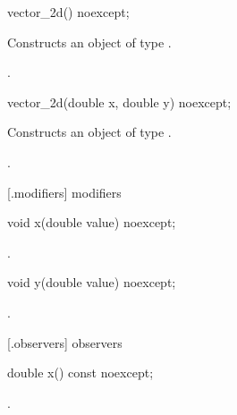 \begin{itemdecl}
vector_2d() noexcept;
\end{itemdecl}
\begin{itemdescr}
	\pnum
	\effects
	Constructs an object of type .
	
	\pnum
	\postconditions
	.
\end{itemdescr}

\begin{itemdecl}
vector_2d(double x, double y) noexcept;
\end{itemdecl}
\begin{itemdescr}
	\pnum
	\effects
	Constructs an object of type .
	
	\pnum
	\postconditions
	.
\end{itemdescr}
	
 [\vectortwod.modifiers]{ modifiers}

\begin{itemdecl}
void x(double value) noexcept;
\end{itemdecl}
\begin{itemdescr}
	\pnum
	\postconditions
	.
	
\end{itemdescr}

\begin{itemdecl}
    void y(double value) noexcept;
\end{itemdecl}
\begin{itemdescr}
	\pnum
	\postconditions
	.
	
\end{itemdescr}

 [\vectortwod.observers]{ observers}

\begin{itemdecl}
    double x() const noexcept;
\end{itemdecl}
\begin{itemdescr}
	\pnum
	\returns
	.
\end{itemdescr}

